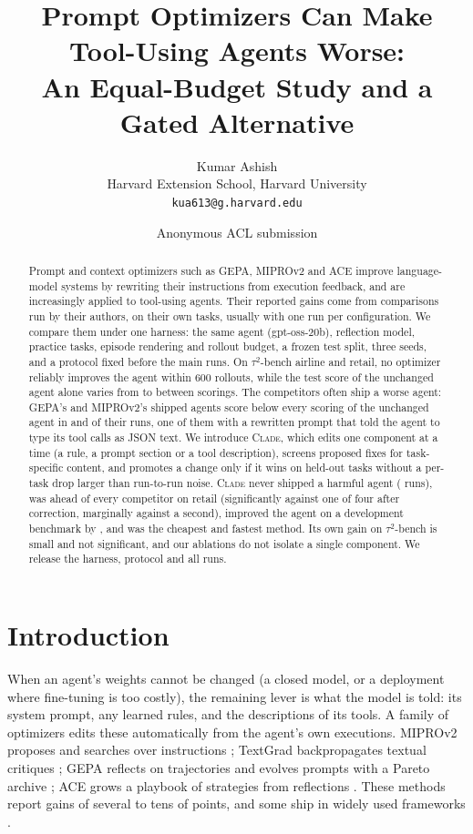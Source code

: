 \documentclass[11pt]{article}
\title{Prompt Optimizers Can Make Tool-Using Agents Worse:\\An Equal-Budget Study and a Gated Alternative}
\author{Kumar Ashish \\
  Harvard Extension School, Harvard University \\
  \texttt{kua613@g.harvard.edu}}
\author{Anonymous ACL submission}
\newcommand{\clade}{\textsc{Clade}\xspace}
\newcommand{\taub}{$\tau^2$-bench\xspace}
\begin{document}
\maketitle

\begin{abstract}
Prompt and context optimizers such as GEPA, MIPROv2 and ACE improve language-model systems by rewriting their
instructions from execution feedback, and are increasingly applied to tool-using agents. Their reported gains come
from comparisons run by their authors, on their own tasks, usually with one run per configuration. We compare them
under one harness: the same agent (gpt-oss-20b), reflection model, practice tasks, episode rendering and rollout
budget, a frozen test split, three seeds, and a protocol fixed before the main runs. On \taub airline and retail, no
optimizer reliably improves the agent within 600 rollouts, while the test score of the unchanged agent alone varies
from \startAirMin{} to \startAirMax{} between scorings. The competitors often ship a worse agent: GEPA's and
MIPROv2's shipped agents score below every scoring of the unchanged agent in \harmGepa{} and \harmMipro{} of their
runs, one of them with a rewritten prompt that told the agent to type its tool calls as JSON text. We introduce \clade, which edits one component at a time (a rule, a prompt section or a
tool description), screens proposed fixes for task-specific content, and promotes a change only if it wins on
held-out tasks without a per-task drop larger than run-to-run noise. \clade never shipped a harmful agent
(\harmClade{} runs), was ahead of every competitor on retail (significantly against one of four after correction, marginally against a
second), improved the agent
on a development benchmark by \cladeSdGain{}, and was the cheapest and fastest method. Its own gain on \taub is small
and not significant, and our ablations do not isolate a single component. We release the harness, protocol and all
runs.
\end{abstract}

\section{Introduction}

When an agent's weights cannot be changed (a closed model, or a deployment where fine-tuning is too costly), the
remaining lever is what the model is told: its system prompt, any learned rules, and the descriptions of its tools.
A family of optimizers edits these automatically from the agent's own executions. MIPROv2 proposes and searches over
instructions \citep{mipro}; TextGrad backpropagates textual critiques \citep{textgrad}; GEPA reflects on trajectories
and evolves prompts with a Pareto archive \citep{gepa}; ACE grows a playbook of strategies from reflections
\citep{ace}. These methods report gains of several to tens of points, and some ship in widely used frameworks
\citep{dspy}.
\end{document}
